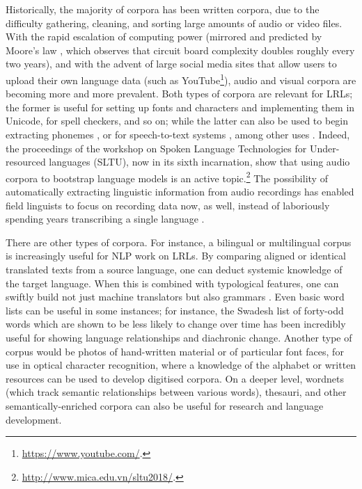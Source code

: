 Historically, the majority of corpora has been written corpora, due to the difficulty gathering, cleaning, and sorting large amounts of audio or video files. With the rapid escalation of computing power (mirrored and predicted by Moore's law \citep{schaller1997moore}, which observes that circuit board complexity doubles roughly every two years), and with the advent of large social media sites that allow users to upload their own language data (such as YouTube\footnote{\href{https://www.youtube.com/}{https://www.youtube.com/}. }), audio and visual corpora are becoming more and more prevalent. Both types of corpora are relevant for LRLs; the former is useful for setting up fonts and characters and implementing them in Unicode, for spell checkers, and so on; while the latter can also be used to begin extracting phonemes \citep{kempton2014discovering, muller2017improving}, or for speech-to-text systems \citep{fraga2015active, fraga2015improving}, among other uses \citep{adams2017automatic}. Indeed, the proceedings of the workshop on Spoken Language Technologies for Under-resourced languages (SLTU), now in its sixth incarnation, show that using audio corpora to bootstrap language models is an active topic.\footnote{\href{http://www.mica.edu.vn/sltu2018/}{http://www.mica.edu.vn/sltu2018/}. } The possibility of automatically extracting linguistic information from audio recordings has enabled field linguists to focus on recording data now, as well, instead of laboriously spending years transcribing a single language \citep{bird2014aikuma}.

There are other types of corpora. For instance, a bilingual or multilingual corpus is increasingly useful for NLP work on LRLs. By comparing aligned or identical translated texts from a source language, one can deduct systemic knowledge of the target language. When this is combined with typological features, one can swiftly build not just machine translators \citep{lewis2010haitian} but also grammars \citep{bender2016linguistic}. Even basic word lists can be useful in some instances; for instance, the Swadesh list of forty-odd words which are shown to be less likely to change over time \citep{swadesh1955towards} has been incredibly useful for showing language relationships and diachronic change. Another type of corpus would be photos of hand-written material or of particular font faces, for use in optical character recognition, where a knowledge of the alphabet or written resources can be used to develop digitised corpora. On a deeper level, wordnets (which track semantic relationships between various words), thesauri, and other semantically-enriched corpora can also be useful for research and language development.


